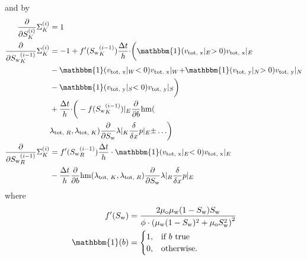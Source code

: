 \documentclass[conference]{IEEEtran}
\newcommand*{\indicator}{\ensuremath{\mathbb{1}}}
\newcommand*{\pdiff}[2]{\ensuremath{\frac{\partial}{\partial{#2}}{#1}}}
\newcommand*{\ddiff}[2]{\ensuremath{\frac{\delta}{\delta{#2}}{#1}}}
\renewcommand*{\indicator}{\ensuremath{\mathbbm{1}}}
\DeclareMathOperator*{\hmean}{hm}
\begin{document}
and by
\begin{align}
\pdiff{\Sigma_K^{(i)}}{S_K^{(i)}} &= 1 \\
\pdiff{\Sigma_K^{(i)}}{{S_{\text{w}}}_K^{(i-1)}} &=  -1 + f^\prime({S_{\text{w}}}_K^{(i-1)}) \frac{\Delta t}{h}\cdot \biggr(\indicator(v_\text{tot, x}\lvert_E > 0) v_\text{tot, x}\lvert_E \\&- \indicator(v_\text{tot, x}\lvert_W < 0) v_\text{tot, x}\lvert_W + \indicator(v_\text{tot, y}\lvert_N > 0) v_\text{tot, y}\lvert_N  \nonumber\\&- \indicator(v_\text{tot, y}\lvert_S < 0) v_\text{tot, y}\lvert_S\biggr) \nonumber\\ &+\frac{\Delta t}{h}\cdot\biggr(-f({S_{\text{w}}}_K^{(i-1)})\lvert_E \pdiff{\hmean}{b}(\nonumber\\&\lambda_{\text{tot, }R}, \lambda_{\text{tot, }K}) \pdiff{\lambda}{S_\text{w}}\lvert_K \ddiff{p}{x}\lvert_E\pm \ldots\biggr) \nonumber\\
\pdiff{\Sigma_K^{(i)}}{{S_{\text{w}}}_R^{(i-1)}} &= f^\prime({S_{\text{w}}}_R^{(i-1)}) \frac{\Delta t}{h}\cdot \indicator(v_\text{tot, x}\lvert_E < 0) v_\text{tot, x}\lvert_E \nonumber\\&- \frac{\Delta t}{h} \pdiff{\hmean}{b}(\lambda_{\text{tot, }K}, \lambda_{\text{tot, }R}) \pdiff{\lambda}{S_\text{w}}\lvert_R \ddiff{p}{x}\lvert_E
\end{align}
where
\begin{align}
f^\prime(S_\text{w}) &=  \frac{2\mu_\text{o}\mu_\text{w} (1 - S_\text{w})S_\text{w}}{\phi \cdot \left(\mu_\text{w}(1 - S_\text{w})^2 + \mu_\text{o}S_\text{w}^2\right)^2}\\
\indicator(b) &= \begin{cases} 1, &\text{if } b \text{ true} \\ 0, &\text{otherwise.}
\end{cases}
\end{align}
\end{document}
